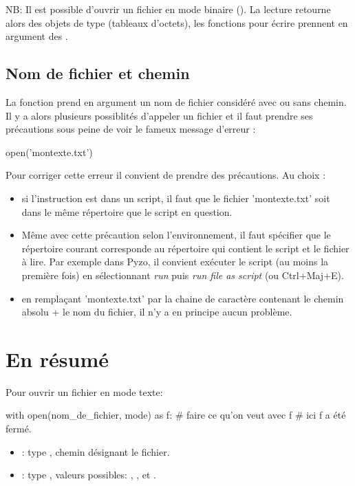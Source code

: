 NB: Il est possible d'ouvrir un fichier en mode binaire
(). La lecture retourne alors des objets de type
 (tableaux d'octets), les fonctions pour écrire prennent en
argument des .


\subsection{Nom de fichier et chemin}

La fonction  prend en argument un nom de fichier considéré avec ou sans chemin. Il y a alors plusieurs possiblités d'appeler un fichier et il faut prendre ses précautions sous peine de voir le fameux message d'erreur : 

\begin{pyconsole}
open('montexte.txt')
\end{pyconsole}

Pour corriger cette erreur il convient de prendre des précautions. Au choix :
\begin{itemize}
\item si l'instruction  est dans un script, il faut que le fichier 'montexte.txt' soit dans le même répertoire que le script en question.
\item Même avec cette précaution selon l'environnement, il faut spécifier que le répertoire courant corresponde au répertoire qui contient le script et le fichier à lire. Par exemple dans Pyzo, il convient exécuter le script (au moins la première fois) en sélectionnant \textit{run} puis \textit{run file as script} (ou Ctrl+Maj+E).
\item en remplaçant 'montexte.txt' par la chaine de caractère contenant le chemin absolu + le nom du fichier, il n'y a en principe aucun problème.
\end{itemize}

\section{En résumé}
Pour ouvrir un fichier en mode texte:

\begin{pyverbatim}
with open(nom_de_fichier, mode) as f:
    # faire ce qu'on veut avec f
# ici f a été fermé.
\end{pyverbatim}
\begin{itemize}
  \item[\textbullet]  : type , chemin désignant le fichier.
  \item[\textbullet]  : type , valeurs possibles: , , et .
\end{itemize}

